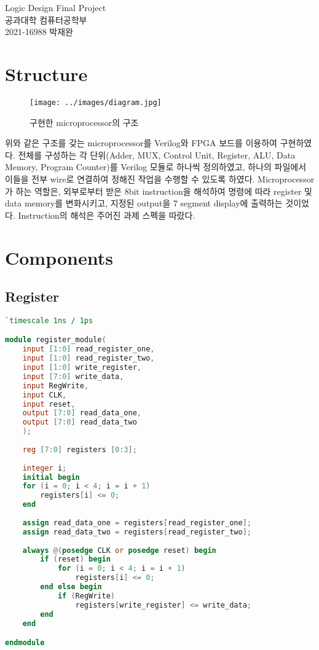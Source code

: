 \documentclass[10pt]{article}
\begin{document}
    \begin{center}
        {\LARGE Logic Design Final Project} \\
        \vspace{2mm}
        공과대학 컴퓨터공학부 \\
        2021-16988 박재완
    \end{center}
    
    \section{Structure}
    \begin{figure}[H]
        \centering
        \texttt{[image: ../images/diagram.jpg]}
        \caption{\small 구현한 microprocessor의 구조}
    \end{figure}
    위와 같은 구조를 갖는 microprocessor를 Verilog와 FPGA 보드를 이용하여 구현하였다.
    전체를 구성하는 각 단위(Adder, MUX, Control Unit, Register, ALU, Data Memory, Program Counter)를 Verilog 모듈로 하나씩 정의하였고, 하나의 파일에서 이들을 전부 wire로 연결하여 정해진 작업을 수행할 수 있도록 하였다.
    Microprocessor가 하는 역할은, 외부로부터 받은 8bit instruction을 해석하여 명령에 따라 register 및 data memory를 변화시키고, 지정된 output을 7 segment display에 출력하는 것이었다.
    Instruction의 해석은 주어진 과제 스펙을 따랐다.

    \section{Components}
    
    \subsection{Register}
    \begin{lstlisting}[language=Verilog, caption=register\_module.v]
`timescale 1ns / 1ps

module register_module(
    input [1:0] read_register_one,
	input [1:0] read_register_two,
	input [1:0] write_register,
	input [7:0] write_data,
	input RegWrite,
	input CLK,
	input reset,
	output [7:0] read_data_one,
	output [7:0] read_data_two
	);
	
	reg [7:0] registers [0:3];
	
	integer i;
	initial begin
	for (i = 0; i < 4; i = i + 1)
		registers[i] <= 0;
	end
	
	assign read_data_one = registers[read_register_one];
	assign read_data_two = registers[read_register_two];
	
	always @(posedge CLK or posedge reset) begin
        if (reset) begin
            for (i = 0; i < 4; i = i + 1)
                registers[i] <= 0;
        end else begin
            if (RegWrite)
                registers[write_register] <= write_data;
        end
    end

endmodule
    \end{lstlisting}
\end{document}
